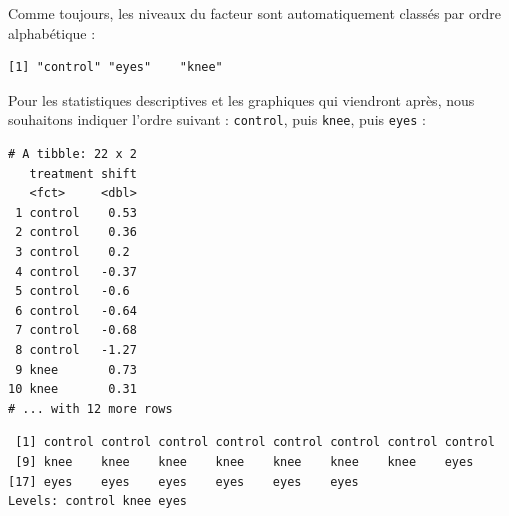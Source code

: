 \documentclass[a4paperpaper,]{article}
\newenvironment{Shaded}{\begin{snugshade}}{\end{snugshade}}
\newcommand{\DataTypeTok}[1]{\textcolor[rgb]{0.00,0.34,0.68}{#1}}
\newcommand{\KeywordTok}[1]{\textcolor[rgb]{0.12,0.11,0.11}{\textbf{#1}}}
\newcommand{\NormalTok}[1]{\textcolor[rgb]{0.12,0.11,0.11}{#1}}
\newcommand{\OperatorTok}[1]{\textcolor[rgb]{0.12,0.11,0.11}{#1}}
\newcommand{\StringTok}[1]{\textcolor[rgb]{0.75,0.01,0.01}{#1}}
\begin{document}
Comme toujours, les niveaux du facteur sont automatiquement classés par ordre alphabétique :

\begin{Shaded}
\end{Shaded}

\begin{verbatim}
[1] "control" "eyes"    "knee"   
\end{verbatim}

Pour les statistiques descriptives et les graphiques qui viendront après, nous souhaitons indiquer l'ordre suivant : \texttt{control}, puis \texttt{knee}, puis \texttt{eyes} :

\begin{Shaded}
\end{Shaded}

\begin{verbatim}
# A tibble: 22 x 2
   treatment shift
   <fct>     <dbl>
 1 control    0.53
 2 control    0.36
 3 control    0.2 
 4 control   -0.37
 5 control   -0.6 
 6 control   -0.64
 7 control   -0.68
 8 control   -1.27
 9 knee       0.73
10 knee       0.31
# ... with 12 more rows
\end{verbatim}

\begin{Shaded}
\end{Shaded}

\begin{verbatim}
 [1] control control control control control control control control
 [9] knee    knee    knee    knee    knee    knee    knee    eyes   
[17] eyes    eyes    eyes    eyes    eyes    eyes   
Levels: control knee eyes
\end{verbatim}
\end{document}
